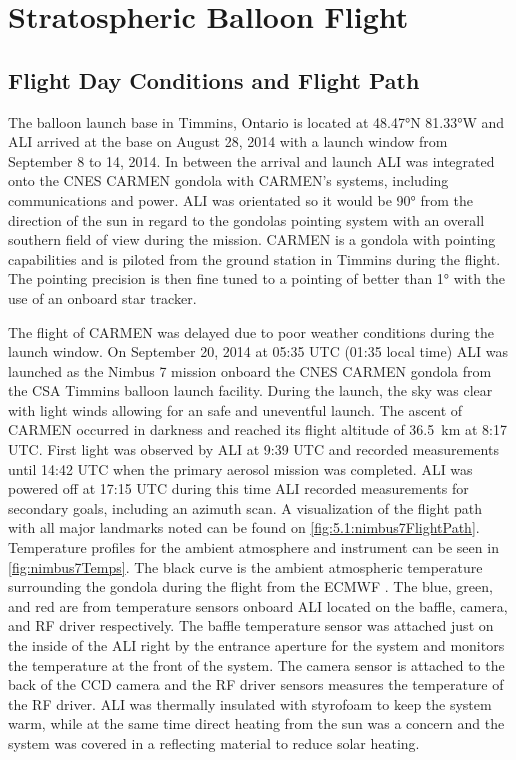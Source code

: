 \documentclass[12pt]{article}
\begin{document}
\section{Stratospheric Balloon Flight}

\subsection{Flight Day Conditions and Flight Path}

The balloon launch base in Timmins, Ontario is located at 48.47\si{\degree}N 81.33\si{\degree}W and ALI arrived at the base on August 28, 2014 with a launch window from September 8 to 14, 2014. In between the arrival and launch ALI was integrated onto the CNES CARMEN gondola with CARMEN's systems, including communications and power. ALI was orientated so it would be 90\si{\degree} from the direction of the sun in regard to the gondolas pointing system with an overall southern field of view during the mission. CARMEN is a gondola with pointing capabilities and is piloted from the ground station in Timmins during the flight. The pointing precision is then fine tuned to a pointing of better than 1\si{\degree} with the use of an onboard star tracker.

The flight of CARMEN was delayed due to poor weather conditions during the launch window. On September 20, 2014 at 05:35 UTC (01:35 local time) ALI was launched as the Nimbus 7 mission onboard the CNES CARMEN gondola from the CSA Timmins balloon launch facility. During the launch, the sky was clear with light winds allowing for an safe and uneventful launch. The ascent of CARMEN occurred in darkness and reached its flight altitude of 36.5~km at 8:17 UTC. First light was observed by ALI at 9:39 UTC and recorded measurements until 14:42 UTC when the primary aerosol mission was completed. ALI was powered off at 17:15 UTC during this time ALI recorded measurements for secondary goals, including an azimuth scan. A visualization of the flight path with all major landmarks noted can be found on \autoref{fig:5.1:nimbus7FlightPath}. Temperature profiles for the ambient atmosphere and instrument can be seen in \autoref{fig:nimbus7Temps}. The black curve is the ambient atmospheric temperature surrounding the gondola during the flight from the ECMWF \citep{Molteni1996}. The blue, green, and red are from temperature sensors onboard ALI located on the baffle, camera, and RF driver respectively. The baffle temperature sensor was attached just on the inside of the ALI right by the entrance aperture for the system and monitors the temperature at the front of the system. The camera sensor is attached to the back of the CCD camera and the RF driver sensors measures the temperature of the RF driver. ALI was thermally insulated with styrofoam to keep the system warm, while at the same time direct heating from the sun was a concern and the system was covered in a reflecting material to reduce solar heating.
\end{document}
